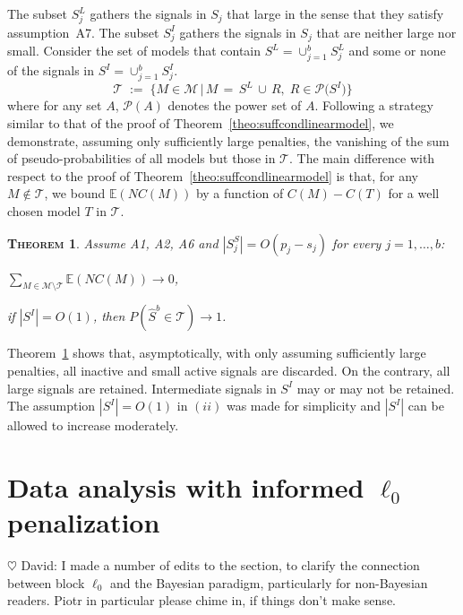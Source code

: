 \documentclass[aos]{imsart}
\theoremstyle{plain}
\newtheorem{thm}{\textsc{Theorem}}[section]
\newcommand{\david}[1]{{\small{\color{blue} \sf $\heartsuit$ David: #1}}}
\newcommand{\E}{\mathbb{E}}
\newcommand{\M}{\mathcal{M}}
\newcommand{\T}{\mathcal{T}}
\begin{document}
The subset $S_j^{L}$ gathers the signals in $S_j$ that large in the sense that they satisfy assumption~A7. The subset $S_j^{I}$ gathers the signals in $S_j$ that are neither large nor small. Consider the set of models that contain $S^L=\cup_{j=1}^b S^L_j$ and some or none of the signals in $S^I=\cup_{j=1}^b S^I_j$.
\begin{equation}
    \T \;:=\;\Big\{M \in \M \,\big|\, M\,=\, S^L\,\cup\,R,\; R\in \mathcal{P}\big(S^I\big)  \Big\}
\end{equation}
where for any set $A$, $ \mathcal{P}(A)$ denotes the power set of $A$.
Following a strategy similar to that of the proof of Theorem~\ref{theo:suffcondlinearmodel}, we demonstrate, assuming only sufficiently large penalties, the vanishing of the sum of pseudo-probabilities of all models but those in $\T$. The main difference with respect to the proof of Theorem~\ref{theo:suffcondlinearmodel} is that, for any $M\not\in \T$, we bound $\E(NC(M))$ by a function of $C(M)-C(T)$ for a well chosen model $T$ in $\T$. 
\begin{thm}\label{thm:convtoT}
    Assume A1, A2, A6 and $|S^S_j|=O(p_j-s_j)$ for every $j=1,\ldots,b$:
    \begin{longlist}
        \item $\sum_{M \in \M\setminus \T} \E\left(NC(M)\right)\to 0$,
        \item if $|S^I|=O(1)$, then $P(\hat{S}^b \in \T)\to 1$.
    \end{longlist}
\end{thm}
Theorem~\ref{thm:convtoT} shows that, asymptotically, with only assuming sufficiently large penalties, all inactive and small active signals are discarded. On the contrary, all large signals are retained. Intermediate signals in $S^I$ may or may not be retained. The assumption $|S^I|=O(1)$ in $(ii)$ was made for simplicity and $|S^I|$ can be allowed to increase moderately. 

\section{Data analysis with informed $\ell_0$ penalization}\label{sec:informed_l0}

\david{I made a number of edits to the section, to clarify the connection between block $\ell_0$ and the Bayesian paradigm, particularly for non-Bayesian readers. Piotr in particular please chime in, if things don't make sense.}
\end{document}
